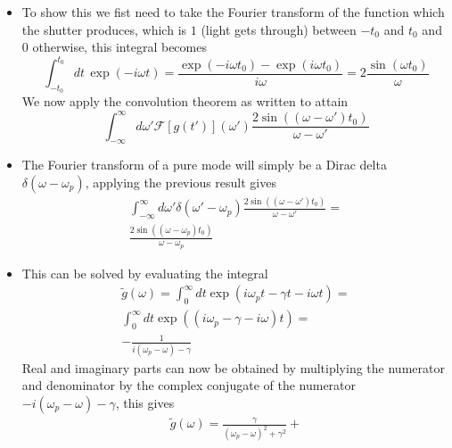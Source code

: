 \documentclass[english]{article}
\begin{document}
\begin{enumerate}
\begin{itemize}
\begin{align}
 \int_{-\infty}^\infty dt \int_{-\infty}^\infty dt'  g(t) h(t')\exp(-i\omega t)  \delta(t-t')=\\
  \int_{-\infty}^\infty dt\, g(t) h(t)\exp(-i\omega t)= \mathcal{F}[g(t)h(t)](\omega)
 \end{align}
 Since $\omega'$ only appears in one place in the integral and oscillatory integrals vanish when integrated over the full real line, this will only be non-zero for $t=t'$ (as the hint says, it becomes a Dirac delta). The proof for the inverse Fourier transform would proceed along the same lines but with $-$ signs in different places
 \item To show this we fist need to take the Fourier transform of the function which the shutter produces, which is $1$ (light gets through) between $-t_0$ and $t_0$ and $0$ otherwise, this integral becomes
 \begin{equation}
 \int_{-t_0}^{t_0} dt \, \exp(-i \omega t)=\frac{\exp(-i \omega t_0)-\exp(i \omega t_0)}{i\omega}=2\frac{\sin(\omega t_0)}{\omega}
 \end{equation}
 We now apply the convolution theorem as written to attain 
 \begin{equation}
 \int_{-\infty}^\infty d\omega'\mathcal{F}[g(t')](\omega') \frac{2\sin((\omega-\omega') t_0)}{\omega-\omega'}
 \end{equation}
 \item The Fourier transform of a pure mode will simply be a Dirac delta $\delta(\omega-\omega_p)$, applying the previous result gives 
  \begin{align}
 \int_{-\infty}^\infty d\omega'\delta(\omega'-\omega_p) \frac{2\sin((\omega-\omega') t_0)}{\omega-\omega'}=\\
 \frac{2\sin((\omega-\omega_p) t_0)}{\omega-\omega_p}
 \end{align}
 \item This can be solved by evaluating the integral 
 \begin{align}
 \tilde{g}(\omega)=\int_0^\infty dt \exp(i \omega_p t -\gamma t -i \omega t)=\\
 \int_0^\infty dt \exp((i \omega_p -\gamma  -i \omega) t)=\\
 -\frac{1}{i(\omega_p-\omega)- \gamma}
 \end{align}
 Real and imaginary parts can now be obtained by multiplying the numerator and denominator by the complex conjugate of the numerator $-i(\omega_p-\omega)- \gamma$, this gives
  \begin{align}
 \tilde{g}(\omega)=\frac{\gamma}{(\omega_p-\omega)^2+ \gamma^2}+

\end{align}
\end{itemize}
\end{enumerate}
\end{document}
